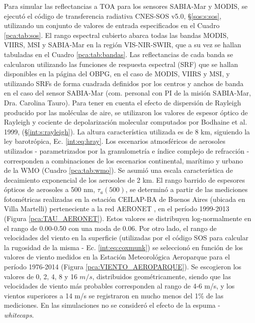         Para simular las reflectancias a TOA para los sensores SABIA-Mar y MODIS, se ejecutó el código de transferencia radiativa CNES-SOS v5.0, \S \ref{sos:s:sos}, utilizando un conjunto de valores de entrada especificados en el Cuadro \ref{pca:tab:sos}.
        El rango espectral cubierto abarca todas las bandas MODIS, VIIRS, MSI y SABIA-Mar en la región VIS-NIR-SWIR, que a su vez se hallan tabuladas en el Cuadro \ref{pca:tab:bandas}. Las reflectancias de cada banda se calcularon utilizando las funciones de respuesta espectral (SRF) que se hallan disponibles en la página del OBPG, \cite{obpg} en el caso de MODIS, VIIRS y MSI, y utilizando SRFs de forma cuadrada definidos por los centros y anchos de banda en el caso del sensor SABIA-Mar (com. personal con PI de la misión SABIA-Mar, Dra. Carolina Tauro).
        Para tener en cuenta el efecto de dispersión de Rayleigh producido por las moléculas de aire, se utilizaron los valores de espesor óptico de Rayleigh y cociente de depolarización molecular computados por Bodhaine et al. 1999, \cite{bodhaine1999} (\S \ref{int:s:rayleigh}). La altura característica utilizada es de 8 km, siguiendo la ley barotrópica, Ec. \ref{int:eq:hray}.
        Los escenarios atmosféricos de aerosoles utilizados - parametrizados por la granulometría e índice complejo de refracción -  corresponden a combinaciones de los escenarios continental, marítimo y urbano de la WMO (Cuadro \ref{pca:tab:wmo}). Se asumió una escala característica de decaimiento exponencial de los aerosoles de 2 km. 
        El rango barrido de espesores ópticos de aerosoles a 500 nm, $\tau_{a}(500)$, se determinó a partir de las mediciones fotométricas realizadas en la estación CEILAP-BA de Buenos Aires (ubicada en Villa Martelli) perteneciente a la red AERONET \cite{aeronet}, en el período 1999-2013 (Figura \ref{pca:TAU_AERONET}). Estos valores se distribuyen log-normalmente en el rango de 0.00-0.50 con una moda de 0.06.
        Por otro lado, el rango de velocidades del viento en la superficie (utilizadas por el código SOS para calcular la rugosidad de la misma - Ec. \ref{int:eq:coxmunk}) se seleccionó en función de los valores de viento medidos en la Estación Meteorológica Aeroparque para el período 1976-2014 (Figura \ref{pca:VIENTO_AEROPARQUE}). Se escogieron los valores de 0, 2, 4, 8 y 16 $m/s$, distribuidos geométricamente, siendo que las velocidades de viento más probables corresponden al rango de 4-6 m/s, y los vientos superiores a 14 m/s se registraron en mucho menos del 1\% de las mediciones. En las simulaciones no se consideró el efecto de la espuma - \textit{whitecaps}.

